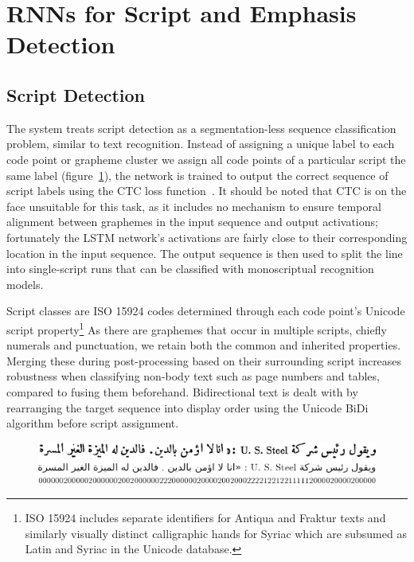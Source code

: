\section{RNNs for Script and Emphasis Detection}

\subsection{Script Detection}

The system treats script detection as a segmentation-less sequence
classification problem, similar to text recognition. Instead of assigning a
unique label to each code point or grapheme cluster we assign all code points
of a particular script the same label (figure~\ref{fig:read_transcription}), the network is trained to output the
correct sequence of script labels using the CTC loss
function~\cite{graves2006connectionist}. It should be noted that CTC is on the
face unsuitable for this task, as it includes no mechanism to ensure temporal
alignment between graphemes in the input sequence and output activations;
fortunately the LSTM network's activations are fairly close to their
corresponding location in the input sequence. The output sequence is then used
to split the line into single-script runs that can be classified with
monoscriptual recognition models.

Script classes are ISO 15924 codes determined through each code point's Unicode
script property\footnote{ISO 15924 includes separate identifiers for Antiqua
and Fraktur texts and similarly visually distinct calligraphic hands for Syriac
which are subsumed as Latin and Syriac in the Unicode database.} As there are
graphemes that occur in multiple scripts, chiefly numerals and punctuation, we
retain both the common and inherited properties. Merging these during
post-processing based on their surrounding script increases robustness when
classifying non-body text such as page numbers and tables, compared to fusing
them beforehand. Bidirectional text is dealt with by rearranging the target
sequence into display order using the Unicode BiDi algorithm before script
assignment.

\begin{figure}
        \includegraphics[width=\linewidth]{transcription.png}
        \centering
        \label{fig:read_transcription}
\end{figure}

